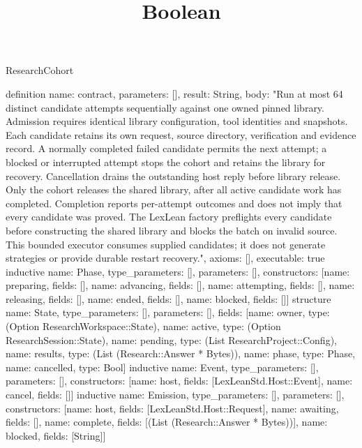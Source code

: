 \begin{lexlean}{ResearchCohort}
\title{Boolean}
\begin{semanticmodule}
definition{
 name: contract,
 parameters: [],
 result: String,
 body: "Run at most 64 distinct candidate attempts sequentially against one owned pinned library. Admission requires identical library configuration, tool identities and snapshots. Each candidate retains its own request, source directory, verification and evidence record. A normally completed failed candidate permits the next attempt; a blocked or interrupted attempt stops the cohort and retains the library for recovery. Cancellation drains the outstanding host reply before library release. Only the cohort releases the shared library, after all active candidate work has completed. Completion reports per-attempt outcomes and does not imply that every candidate was proved. The LexLean factory preflights every candidate before constructing the shared library and blocks the batch on invalid source. This bounded executor consumes supplied candidates; it does not generate strategies or provide durable restart recovery.",
 axioms: [],
 executable: true
}
inductive{
 name: Phase,
 type_parameters: [],
 parameters: [],
 constructors: [{name: preparing, fields: []}, {name: advancing, fields: []}, {name: attempting, fields: []}, {name: releasing, fields: []}, {name: ended, fields: []}, {name: blocked, fields: []}]
}
structure{
 name: State,
 type_parameters: [],
 parameters: [],
 fields: [{name: owner, type: (Option ResearchWorkspace::State)}, {name: active, type: (Option ResearchSession::State)}, {name: pending, type: (List ResearchProject::Config)}, {name: results, type: (List (Research::Answer * Bytes))}, {name: phase, type: Phase}, {name: cancelled, type: Bool}]
}
inductive{
 name: Event,
 type_parameters: [],
 parameters: [],
 constructors: [{name: host, fields: [LexLeanStd.Host::Event]}, {name: cancel, fields: []}]
}
inductive{
 name: Emission,
 type_parameters: [],
 parameters: [],
 constructors: [{name: host, fields: [LexLeanStd.Host::Request]}, {name: awaiting, fields: []}, {name: complete, fields: [(List (Research::Answer * Bytes))]}, {name: blocked, fields: [String]}]
}
\end{semanticmodule}
\end{lexlean}
